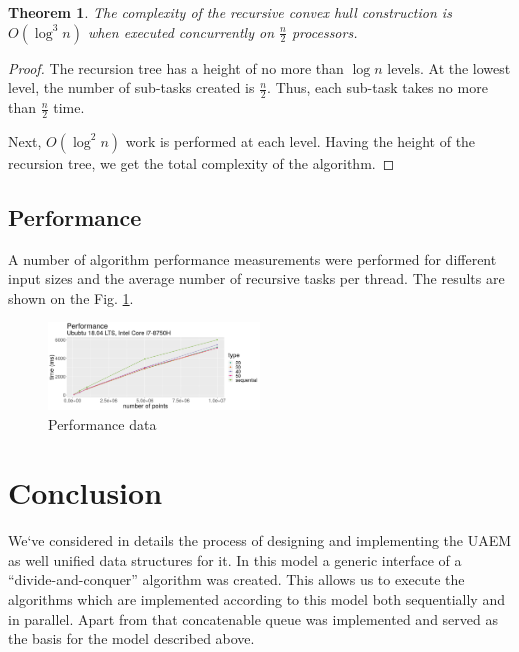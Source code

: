 \documentclass[conference]{IEEEtran}
\theoremstyle{plane}
\newtheorem{theorem}{Theorem}[section]
\begin{document}
		\begin{theorem}
			The complexity of the recursive convex hull construction is $O(\log^3n)$ when executed concurrently on $\frac{n}{2}$ processors.
		\end{theorem}
		
		\begin{proof}
			The recursion tree has a height of no more than $\log n$ levels. At the lowest level, the number of sub-tasks created is $\frac{n}{2}$. Thus, each sub-task takes no more than $\frac{n}{2}$ time.
			
			Next, $O(\log^2 n)$ work is performed at each level. Having the height of the recursion tree, we get the total complexity of the algorithm.
		\end{proof}
	
	

\subsection{Performance}
		A number of algorithm performance measurements were performed for different input sizes and the average number of recursive tasks per thread. The results are shown on the Fig. \ref{fig:performance}.
		
		\begin{figure}[htbp]
			\centerline{\includegraphics[width=0.5\textwidth, height=0.3\textheight]{performance}}
			\caption{Performance data}
			\label{fig:performance}
		\end{figure}
\section{Conclusion}

We`ve considered in details the process of designing and implementing the UAEM as well unified data structures for it. In this model a generic interface of a ``divide-and-conquer'' algorithm was created. This allows us to execute the algorithms which are implemented according to this model both sequentially and in parallel. Apart from that concatenable queue was implemented and served as the basis for the model described above.
\end{document}
